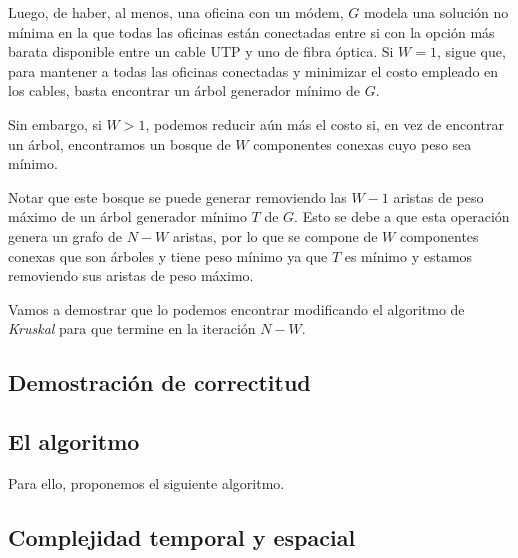 Luego, de haber, al menos, una oficina con un módem, $G$ modela una solución no mínima en la que todas las oficinas están conectadas entre si con la opción más barata disponible entre un cable UTP y uno de fibra óptica. Si $W = 1$, sigue que, para mantener a todas las oficinas conectadas y minimizar el costo empleado en los cables, basta encontrar un árbol generador mínimo de $G$. 

Sin embargo, si $W > 1$, podemos reducir aún más el costo si, en vez de encontrar un árbol, encontramos un bosque de $W$ componentes conexas cuyo peso sea mínimo.

Notar que este bosque se puede generar removiendo las $W-1$ aristas de peso máximo de un árbol generador mínimo $T$ de $G$. Esto se debe a que esta operación genera un grafo de $N - W$ aristas, por lo que se compone de $W$ componentes conexas que son árboles y tiene peso mínimo ya que $T$ es mínimo y estamos removiendo sus aristas de peso máximo. 

Vamos a demostrar que lo podemos encontrar  modificando el algoritmo de \textit{Kruskal} para que termine en la iteración $N-W$.

\subsection{Demostración de correctitud}


\subsection{El algoritmo}

Para ello, proponemos el siguiente algoritmo.


\subsection{Complejidad temporal y espacial}